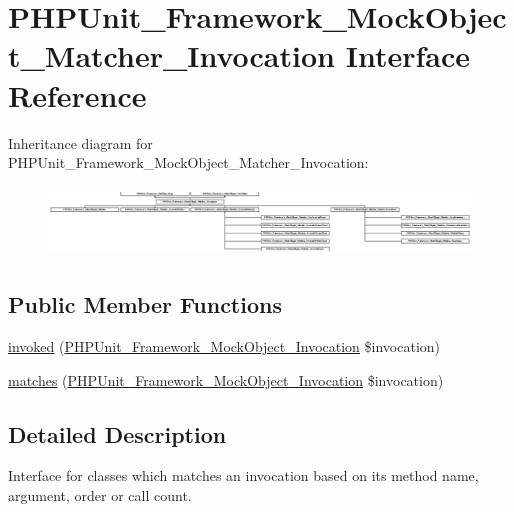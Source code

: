 \hypertarget{interface_p_h_p_unit___framework___mock_object___matcher___invocation}{}\section{P\+H\+P\+Unit\+\_\+\+Framework\+\_\+\+Mock\+Object\+\_\+\+Matcher\+\_\+\+Invocation Interface Reference}
\label{interface_p_h_p_unit___framework___mock_object___matcher___invocation}
Inheritance diagram for P\+H\+P\+Unit\+\_\+\+Framework\+\_\+\+Mock\+Object\+\_\+\+Matcher\+\_\+\+Invocation\+:\begin{figure}[H]
\begin{center}
\leavevmode
\includegraphics[height=1.839080cm]{interface_p_h_p_unit___framework___mock_object___matcher___invocation}
\end{center}
\end{figure}
\subsection*{Public Member Functions}
\begin{DoxyCompactItemize}
\item 
\mbox{\hyperlink{interface_p_h_p_unit___framework___mock_object___matcher___invocation_a63f37b06181c9547bc3c225007c34425}{invoked}} (\mbox{\hyperlink{interface_p_h_p_unit___framework___mock_object___invocation}{P\+H\+P\+Unit\+\_\+\+Framework\+\_\+\+Mock\+Object\+\_\+\+Invocation}} \$invocation)
\item 
\mbox{\hyperlink{interface_p_h_p_unit___framework___mock_object___matcher___invocation_a4988c6fa11e275302172d0a4ae32dd3a}{matches}} (\mbox{\hyperlink{interface_p_h_p_unit___framework___mock_object___invocation}{P\+H\+P\+Unit\+\_\+\+Framework\+\_\+\+Mock\+Object\+\_\+\+Invocation}} \$invocation)
\end{DoxyCompactItemize}


\subsection{Detailed Description}
Interface for classes which matches an invocation based on its method name, argument, order or call count.

